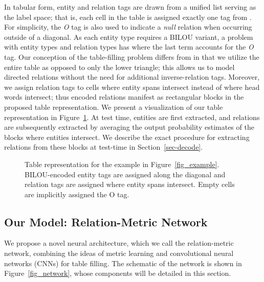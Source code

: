 \documentclass{clv3}
\begin{document}
In tabular form, entity and relation tags are drawn from a unified list  serving as the label space; that is, each cell in the table is assigned exactly one tag from . For simplicity, the \emph{O} tag is also used to indicate a \emph{null} relation when occurring outside of a diagonal. As each entity type requires a BILOU variant, a problem with  entity types and  relation types has  where the last term accounts for the \emph{O} tag. Our conception of the table-filling problem differs from  in that we utilize the entire table as opposed to only the lower triangle; this allows us to model directed relations without the need for additional inverse-relation tags. Moreover, we assign relation tags to cells where entity spans intersect instead of where head words intersect; thus encoded relations manifest as rectangular blocks in the proposed table representation. We present a visualization of our table representation in Figure~\ref{fig_table_rep}. At test time, entities are first extracted, and relations are subsequently extracted by averaging the output probability estimates of the blocks where entities intersect. We describe the exact procedure for extracting relations from these blocks at test-time in Section~\ref{sec-decode}.

\begin{figure}[t]
  \caption{Table representation for the example in Figure~\ref{fig_example}. BILOU-encoded entity tags are assigned along the diagonal and relation tags are assigned where entity spans intersect. Empty cells are implicitly assigned the O tag.}
  \label{fig_table_rep}
\end{figure}

\subsection{Our Model: Relation-Metric Network}

\begin{figure*}[t]
  \caption{Overview of the network architecture for . For simplicity, we ignore punctuation tokens.}
  \label{fig_network}
\end{figure*}

We propose a novel neural architecture, which we call the relation-metric network, combining the ideas of metric learning and convolutional neural networks (CNNs) for table filling. The schematic of the network is shown in Figure~\ref{fig_network}, whose components will be detailed in this section. 
\end{document}
